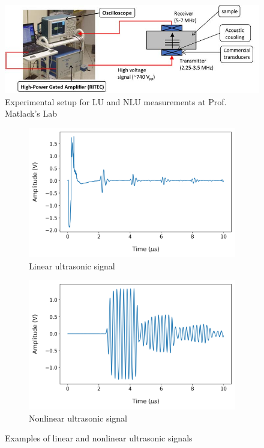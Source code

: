 \begin{figure}[tb]
  \centering
  \includegraphics[width=0.9\linewidth]{fig/ultrasound setup.png}
  \caption{Experimental setup for LU and NLU measurements at Prof. Matlack's Lab}
  \label{fig: ultrasound setup}
\end{figure}

\begin{figure}[tb]
  \centering
  \begin{subfigure}[t]{0.49\linewidth}
    \includegraphics[width=\textwidth]{fig/lu_signal_raw.png}
    \caption{Linear ultrasonic signal}
    \label{fig: lu signal raw}
  \end{subfigure}
  \begin{subfigure}[t]{0.49\linewidth}
    \includegraphics[width=\textwidth]{fig/nlu_singal_raw.png}
    \caption{Nonlinear ultrasonic signal}
    \label{fig: nlu signal raw}
  \end{subfigure}

  \caption{Examples of linear and nonlinear ultrasonic signals}
  \label{fig: lu and nlu signals raw}
\end{figure}

